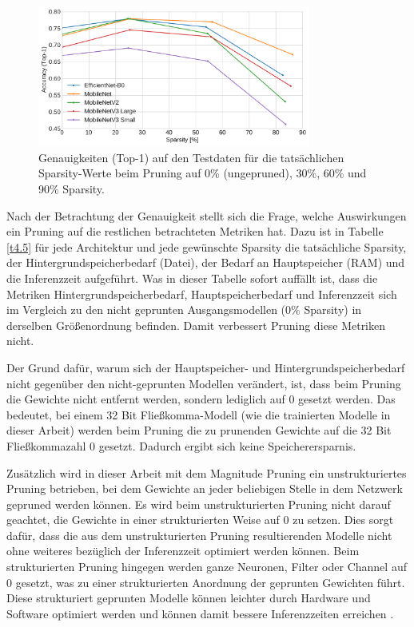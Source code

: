 \begin{figure}[htbp]
\centerline{\includegraphics[width=0.8\textwidth]{content/images/sparsity_vs_accuracy.pdf}}
\caption{Genauigkeiten (Top-1) auf den Testdaten für die tatsächlichen Sparsity-Werte beim Pruning auf 0\% (ungepruned), 30\%, 60\% und 90\% Sparsity.}
\label{f4.2}
\end{figure}

Nach der Betrachtung der Genauigkeit stellt sich die Frage, welche Auswirkungen ein Pruning auf die restlichen betrachteten Metriken hat. Dazu ist in Tabelle \ref{t4.5} für jede Architektur und jede gewünschte Sparsity die tatsächliche Sparsity, der Hintergrundspeicherbedarf (Datei), der Bedarf an Hauptspeicher (RAM) und die Inferenzzeit aufgeführt. Was in dieser Tabelle sofort auffällt ist, dass die Metriken Hintergrundspeicherbedarf, Hauptspeicherbedarf und Inferenzzeit sich im Vergleich zu den nicht geprunten Ausgangsmodellen ($0\%$ Sparsity) in derselben Größenordnung befinden. Damit verbessert Pruning diese Metriken nicht.

Der Grund dafür, warum sich der Hauptspeicher- und Hintergrundspeicherbedarf nicht gegenüber den nicht-geprunten Modellen verändert, ist, dass beim Pruning die Gewichte nicht entfernt werden, sondern lediglich auf 0 gesetzt werden. Das bedeutet, bei einem 32 Bit Fließkomma-Modell (wie die trainierten Modelle in dieser Arbeit) werden beim Pruning die zu prunenden Gewichte auf die 32 Bit Fließkommazahl 0 gesetzt. Dadurch ergibt sich keine Speicherersparnis.

Zusätzlich wird in dieser Arbeit mit dem Magnitude Pruning ein unstrukturiertes Pruning betrieben, bei dem Gewichte an jeder beliebigen Stelle in dem Netzwerk gepruned werden können. Es wird beim unstrukturierten Pruning nicht darauf geachtet, die Gewichte in einer strukturierten Weise auf 0 zu setzen. Dies sorgt dafür, dass die aus dem unstrukturierten Pruning resultierenden Modelle nicht ohne weiteres bezüglich der Inferenzzeit optimiert werden können. Beim strukturierten Pruning hingegen werden ganze Neuronen, Filter oder Channel auf 0 gesetzt, was zu einer strukturierten Anordnung der geprunten Gewichten führt. Diese strukturiert geprunten Modelle können leichter durch Hardware und Software optimiert werden und können damit bessere Inferenzzeiten erreichen \cite{blalock_what_2020}.

